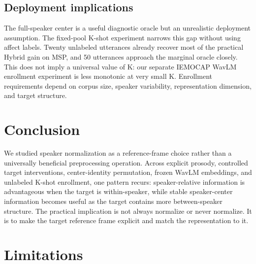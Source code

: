 \documentclass[11pt]{article}
\begin{document}
\subsection{Deployment implications}

The full-speaker center is a useful diagnostic oracle but an unrealistic deployment assumption.
The fixed-pool K-shot experiment narrows this gap without using affect labels.
Twenty unlabeled utterances already recover most of the practical Hybrid gain on MSP, and 50 utterances approach the marginal oracle closely.
This does not imply a universal value of K: our separate IEMOCAP WavLM enrollment experiment is less monotonic at very small K.
Enrollment requirements depend on corpus size, speaker variability, representation dimension, and target structure.

\section{Conclusion}

We studied speaker normalization as a reference-frame choice rather than a universally beneficial preprocessing operation.
Across explicit prosody, controlled target interventions, center-identity permutation, frozen WavLM embeddings, and unlabeled K-shot enrollment, one pattern recurs: speaker-relative information is advantageous when the target is within-speaker, while stable speaker-center information becomes useful as the target contains more between-speaker structure.
The practical implication is not always normalize or never normalize.
It is to make the target reference frame explicit and match the representation to it.

\section*{Limitations}
\end{document}
